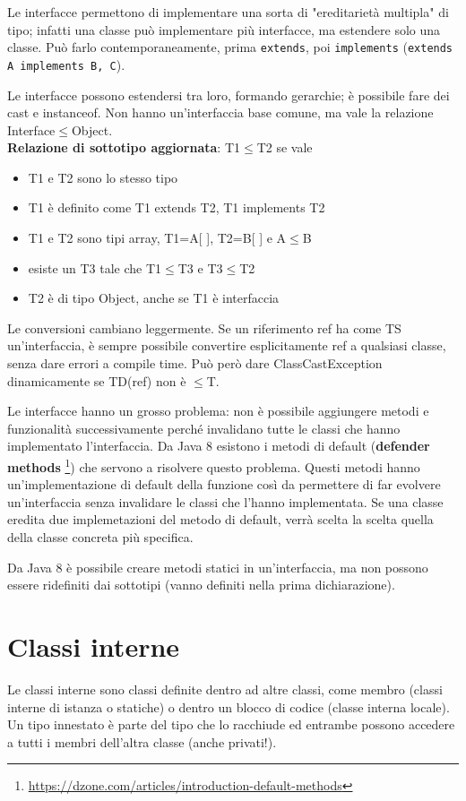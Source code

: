 Le interfacce permettono di implementare una sorta di "ereditarietà multipla" di tipo; infatti una classe può implementare più interfacce, ma estendere solo una classe. Può farlo contemporaneamente, prima \texttt{extends}, poi \texttt{implements} (\texttt{extends A implements B, C}).

Le interfacce possono estendersi tra loro, formando gerarchie; è possibile fare dei cast e instanceof. Non hanno un'interfaccia base comune, ma vale la relazione Interface$\le$Object. \\
\textbf{Relazione di sottotipo aggiornata}: T1$\le$T2 se vale
\begin{itemize}
\item T1 e T2 sono lo stesso tipo
\item T1 è definito come T1 extends T2, T1 implements T2
\item T1 e T2 sono tipi array, T1=A[ ], T2=B[ ] e A$\le$B
\item esiste un T3 tale che T1$\le$T3 e T3$\le$T2
\item T2 è di tipo Object, anche se T1 è interfaccia
\end{itemize}
Le conversioni cambiano leggermente. Se un riferimento ref ha come TS un'interfaccia, è sempre possibile convertire esplicitamente ref a qualsiasi classe, senza dare errori a compile time. Può però dare ClassCastException dinamicamente se TD(ref) non è $\le$T.

Le interfacce hanno un grosso problema: non è possibile aggiungere metodi e funzionalità successivamente perché invalidano tutte le classi che hanno implementato l'interfaccia. Da Java 8 esistono i metodi di default (\textbf{defender methods} \footnote{\url{https://dzone.com/articles/introduction-default-methods}}) che servono a risolvere questo problema. Questi metodi hanno un'implementazione di default della funzione così da permettere di far evolvere un'interfaccia senza invalidare le classi che l'hanno implementata. Se una classe eredita due implemetazioni del metodo di default, verrà scelta la scelta quella della classe concreta più specifica.

Da Java 8 è possibile creare metodi statici in un'interfaccia, ma non possono essere ridefiniti dai sottotipi (vanno definiti nella prima dichiarazione).

\section{Classi interne}
Le classi interne sono classi definite dentro ad altre classi, come membro (classi interne di istanza o statiche) o dentro un blocco di codice (classe interna locale). Un tipo innestato è parte del tipo che lo racchiude ed entrambe possono accedere a tutti i membri dell'altra classe (anche privati!).

